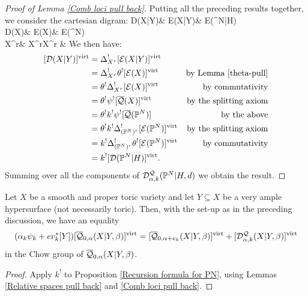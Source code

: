 \begin{proof}[Proof of Lemma \ref{Comb loci pull back}] Putting all the preceding results together, we consider the cartesian digram:
\bcd
\mathcal D(X|Y)\ar[d]\ar[r] & \mathcal E(X|Y)\ar[d]\ar[r] & \mathcal E(\PP^N|H)\ar[d,"\theta"] \\
\mathcal D(X)\ar[d]\ar[r] & \mathcal E(X)\ar[d]\ar[r] & \mathcal E(\PP^N) \\
X^r\ar[r,"\Delta_{X^r}"] & X^r\times X^r & {}
\ecd
We then have:
\begin{align*} [\mathcal D(X|Y)]^{\operatorname{virt}} & = \Delta_{X^r}^! [\mathcal E(X|Y)]^{\operatorname{virt}} & \\
& =  \Delta_{X^r}^! \theta^![\mathcal E(X)]^{\operatorname{virt}} & \text{by Lemma \ref{theta-pull}} \\
& =  \theta^!\Delta_{X^r}^! [\mathcal E(X)]^{\operatorname{virt}} & \text{by commutativity} \\
& =  \theta^!\psi^![\overline{\mathcal{Q}}(X)]^{\operatorname{virt}} & \text{by the splitting axiom} \\
& =  \theta^!k^!\psi^![\overline{\mathcal{Q}}(\mathbb P^N)] & \text{by the above} \\
& =  \theta^!k^!\Delta_{(\mathbb P^N)^r}^![\mathcal E(\mathbb P^N)]^{\operatorname{virt}} & \text{by the splitting axiom} \\
& =  k^!\Delta_{(\mathbb P^N)^r}^!\theta^![\mathcal E(\mathbb P^N)]^{\operatorname{virt}} & \text{by commutativity} \\
& =  k^![\mathcal D(\mathbb P^N|H)]^{\operatorname{virt}}.
\end{align*}
Summing over all the components of $\mathcal{D}^{\mathcal{Q}}_{\alpha,k}(\mathbb P^N|H,d)$ we obtain the result. \end{proof}

\begin{thm} Let $X$ be a smooth and proper toric variety and let $Y \subseteq X$ be a very ample hypersurface (not necessarily toric). Then, with the set-up as in the preceding discussion, we have an equality
\begin{equation*} (\alpha_k \psi_k + ev_k^* [Y]) [\overline{\mathcal Q}_{0,\alpha}(X|Y,\beta)]^{\operatorname{virt}} = [\overline{\mathcal Q}_{0,\alpha+e_k}(X|Y,\beta)]^{\operatorname{virt}} + [\mathcal D^\mathcal{Q}_{\alpha,k}(X|Y,\beta)]^{\operatorname{virt}} \end{equation*}
in the Chow group of $\overline{\mathcal Q}_{0,\alpha}(X|Y,\beta)$. \end{thm}
\begin{proof} Apply $k^!$ to Proposition \ref{Recursion formula for PN}, using Lemmas \ref{Relative spaces pull back} and \ref{Comb loci pull back}. \end{proof}
